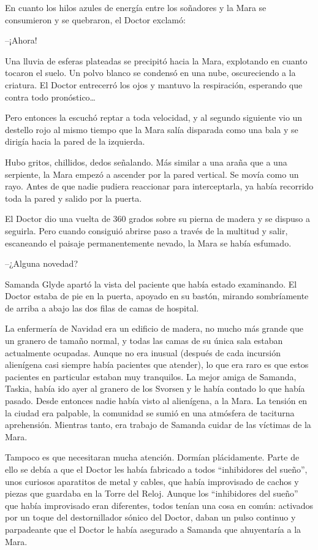 En cuanto los hilos azules de energía entre los soñadores y la Mara se consumieron y se quebraron, el Doctor exclamó:

--¡Ahora!

Una lluvia de esferas plateadas se precipitó hacia la Mara, explotando en cuanto tocaron el suelo. Un polvo blanco se condensó en una nube, oscureciendo a la criatura. El Doctor entrecerró los ojos y mantuvo la respiración, esperando que contra todo pronóstico…

Pero entonces la escuchó reptar a toda velocidad, y al segundo siguiente vio un destello rojo al mismo tiempo que la Mara salía disparada como una bala y se dirigía hacia la pared de la izquierda.

Hubo gritos, chillidos, dedos señalando. Más similar a una araña que a una serpiente, la Mara empezó a ascender por la pared vertical. Se movía como un rayo. Antes de que nadie pudiera reaccionar para interceptarla, ya había recorrido toda la pared y salido por la puerta.

El Doctor dio una vuelta de 360 grados sobre su pierna de madera y se dispuso a seguirla. Pero cuando consiguió abrirse paso a través de la multitud y salir, escaneando el paisaje permanentemente nevado, la Mara se había esfumado.



--¿Alguna novedad?

Samanda Glyde apartó la vista del paciente que había estado examinando. El Doctor estaba de pie en la puerta, apoyado en su bastón, mirando sombríamente de arriba a abajo las dos filas de camas de hospital.

La enfermería de Navidad era un edificio de madera, no mucho más grande que un granero de tamaño normal, y todas las camas de su única sala estaban actualmente ocupadas. Aunque no era inusual (después de cada incursión alienígena casi siempre había pacientes que atender), lo que era raro es que estos pacientes en particular estaban muy tranquilos. La mejor amiga de Samanda, Taskia, había ido ayer al granero de los Svorsen y le había contado lo que había pasado. Desde entonces nadie había visto al alienígena, a la Mara. La tensión en la ciudad era palpable, la comunidad se sumió en una atmósfera de taciturna aprehensión. Mientras tanto, era trabajo de Samanda cuidar de las víctimas de la Mara.

Tampoco es que necesitaran mucha atención. Dormían plácidamente. Parte de ello se debía a que el Doctor les había fabricado a todos “inhibidores del sueño”, unos curiosos aparatitos de metal y cables, que había improvisado de cachos y piezas que guardaba en la Torre del Reloj. Aunque los “inhibidores del sueño” que había improvisado eran diferentes, todos tenían una cosa en común: activados por un toque del destornillador sónico del Doctor, daban un pulso continuo y parpadeante que el Doctor le había asegurado a Samanda que ahuyentaría a la Mara.

